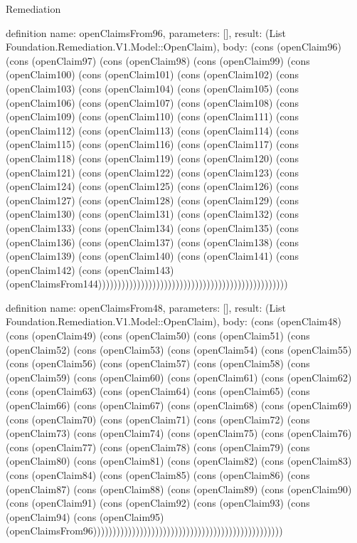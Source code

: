 \begin{lexlean}{Remediation}
\begin{semanticmodule}
definition{
  name: openClaimsFrom96,
  parameters: [],
  result: (List Foundation.Remediation.V1.Model::OpenClaim),
  body: (cons (openClaim96) (cons (openClaim97) (cons (openClaim98) (cons (openClaim99) (cons (openClaim100) (cons (openClaim101) (cons (openClaim102) (cons (openClaim103) (cons (openClaim104) (cons (openClaim105) (cons (openClaim106) (cons (openClaim107) (cons (openClaim108) (cons (openClaim109) (cons (openClaim110) (cons (openClaim111) (cons (openClaim112) (cons (openClaim113) (cons (openClaim114) (cons (openClaim115) (cons (openClaim116) (cons (openClaim117) (cons (openClaim118) (cons (openClaim119) (cons (openClaim120) (cons (openClaim121) (cons (openClaim122) (cons (openClaim123) (cons (openClaim124) (cons (openClaim125) (cons (openClaim126) (cons (openClaim127) (cons (openClaim128) (cons (openClaim129) (cons (openClaim130) (cons (openClaim131) (cons (openClaim132) (cons (openClaim133) (cons (openClaim134) (cons (openClaim135) (cons (openClaim136) (cons (openClaim137) (cons (openClaim138) (cons (openClaim139) (cons (openClaim140) (cons (openClaim141) (cons (openClaim142) (cons (openClaim143) (openClaimsFrom144)))))))))))))))))))))))))))))))))))))))))))))))))
}

definition{
  name: openClaimsFrom48,
  parameters: [],
  result: (List Foundation.Remediation.V1.Model::OpenClaim),
  body: (cons (openClaim48) (cons (openClaim49) (cons (openClaim50) (cons (openClaim51) (cons (openClaim52) (cons (openClaim53) (cons (openClaim54) (cons (openClaim55) (cons (openClaim56) (cons (openClaim57) (cons (openClaim58) (cons (openClaim59) (cons (openClaim60) (cons (openClaim61) (cons (openClaim62) (cons (openClaim63) (cons (openClaim64) (cons (openClaim65) (cons (openClaim66) (cons (openClaim67) (cons (openClaim68) (cons (openClaim69) (cons (openClaim70) (cons (openClaim71) (cons (openClaim72) (cons (openClaim73) (cons (openClaim74) (cons (openClaim75) (cons (openClaim76) (cons (openClaim77) (cons (openClaim78) (cons (openClaim79) (cons (openClaim80) (cons (openClaim81) (cons (openClaim82) (cons (openClaim83) (cons (openClaim84) (cons (openClaim85) (cons (openClaim86) (cons (openClaim87) (cons (openClaim88) (cons (openClaim89) (cons (openClaim90) (cons (openClaim91) (cons (openClaim92) (cons (openClaim93) (cons (openClaim94) (cons (openClaim95) (openClaimsFrom96)))))))))))))))))))))))))))))))))))))))))))))))))
}


\end{semanticmodule}
\end{lexlean}
